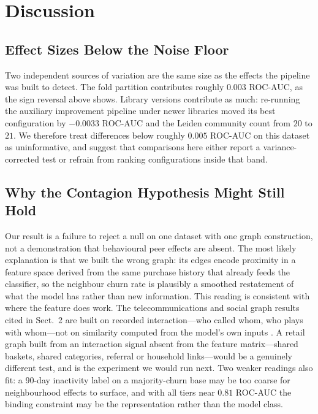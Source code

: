 \documentclass[runningheads]{llncs}
\begin{document}
\section{Discussion}
\label{sec:disc}

\subsection{Effect Sizes Below the Noise Floor}

Two independent sources of variation are the same size as the effects the
pipeline was built to detect. The fold partition contributes roughly $0.003$
ROC-AUC, as the sign reversal above shows. Library versions contribute as much:
re-running the auxiliary improvement pipeline under newer libraries moved its best
configuration by $-0.0033$ ROC-AUC and the Leiden community count from $20$ to
$21$. We therefore treat differences below roughly $0.005$ ROC-AUC on this dataset
as uninformative, and suggest that comparisons here either report a
variance-corrected test or refrain from ranking configurations inside that band.

\subsection{Why the Contagion Hypothesis Might Still Hold}
\label{sec:contagion}

Our result is a failure to reject a null on one dataset with one graph
construction, not a demonstration that behavioural peer effects are absent. The
most likely explanation is that we built the wrong graph: its edges encode
proximity in a feature space derived from the same purchase history that already
feeds the classifier, so the neighbour churn rate is plausibly a smoothed
restatement of what the model has rather than new information. This reading is
consistent with where the feature does work. The telecommunications and social
graph results cited in Sect.~2 are built on recorded interaction---who called
whom, who plays with whom---not on similarity computed from the model's own
inputs \cite{kostic2020socialnetwork,lee2025tempodegraphnet}. A retail graph
built from an interaction signal absent from the feature matrix---shared baskets,
shared categories, referral or household links---would be a genuinely different
test, and is the experiment we would run next.
Two weaker readings also fit: a 90-day inactivity label on a majority-churn base
may be too coarse for neighbourhood effects to surface, and with all tiers near
$0.81$ ROC-AUC the binding constraint may be the representation rather than the
model class.
\end{document}
